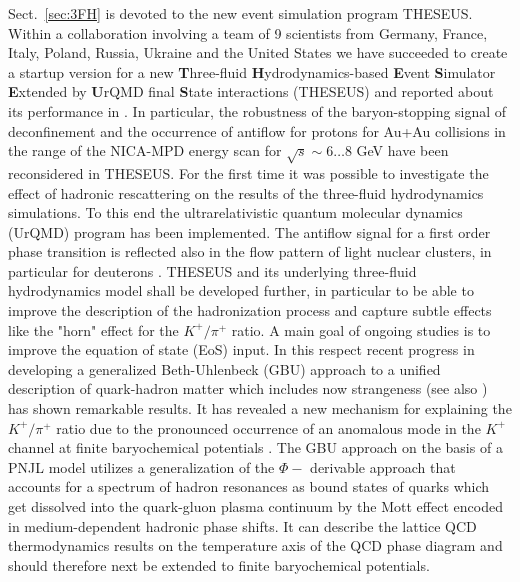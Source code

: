 \documentclass{webofc}
\begin{document}
Sect.~\ref{sec:3FH} is devoted to the new event simulation program THESEUS.	
Within a collaboration involving a team of 9 scientists from Germany, France, Italy, Poland, Russia, Ukraine and the United States we have succeeded to create a startup version for a new {\bf T}hree-fluid 
{\bf H}ydrodynamics-based {\bf E}vent {\bf S}imulator {\bf E}xtended by {\bf U}rQMD final {\bf S}tate interactions (THESEUS) and reported about its performance in \cite{2}. 
In particular, the robustness of the baryon-stopping signal of deconfinement 
\cite{Ivanov:2015vna,Ivanov:2016xev}
and the occurrence of antiflow for protons for Au+Au collisions in the range of the NICA-MPD energy scan for $\sqrt{s} \sim 6 \dots 8$ GeV \cite{2} have been reconsidered in THESEUS.
For the first time it was possible to investigate the effect of hadronic rescattering on the results of the three-fluid hydrodynamics simulations. 
To this end the ultrarelativistic quantum molecular dynamics (UrQMD) program has been implemented. 
The antiflow signal for a first order phase transition is reflected also in the flow pattern of light nuclear clusters, in particular for deuterons \cite{4}. THESEUS and its underlying three-fluid hydrodynamics model shall be developed further, in particular to be able to improve the description of the  hadronization process and capture subtle effects like the "horn" effect for the $K^+/\pi^+$ ratio.
A main goal of ongoing studies is to improve the equation of state (EoS) input.   
	In this respect recent progress in developing a generalized Beth-Uhlenbeck (GBU) approach 
\cite{Schmidt:1990,Hufner:1994ma,Blaschke:2013zaa}	
to a unified description of quark-hadron matter \cite{6} which includes now strangeness \cite{Yamazaki:2013yua,Dubinin:2016wvt} (see also \cite{Torres-Rincon:2016ahl}) has shown remarkable results.
It has revealed a new mechanism for explaining the $K^+/\pi^+$ ratio due to the pronounced occurrence of  an anomalous mode in the $K^+$ channel at finite baryochemical potentials \cite{Dubinin:2016wvt}. 
The GBU approach on the basis of a PNJL model utilizes a generalization of the $\Phi-$ derivable approach that accounts for a spectrum of hadron resonances as bound states of quarks which get dissolved into the quark-gluon plasma continuum by the Mott effect encoded in medium-dependent hadronic phase shifts. It  can describe the lattice QCD thermodynamics results on the temperature axis of the QCD phase diagram \cite{6} and should therefore next be extended to finite baryochemical potentials.  
\end{document}
